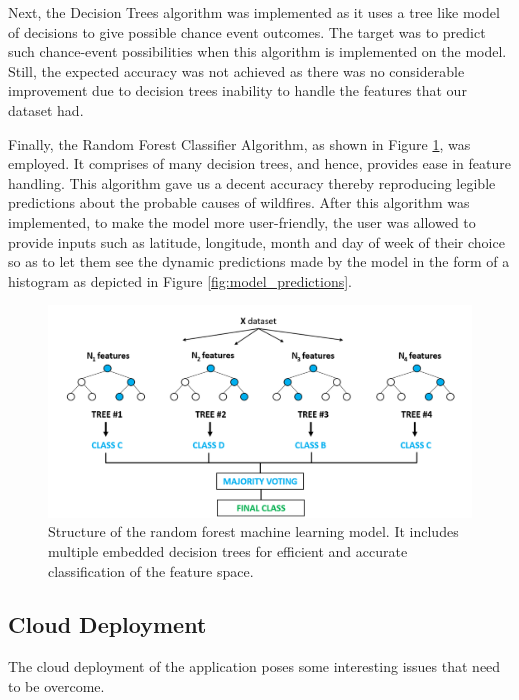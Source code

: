 \documentclass[conference]{IEEEtran}
\begin{document}
Next, the Decision Trees algorithm was implemented as it uses a tree like model of decisions to give possible chance event outcomes. The target was to predict such chance-event possibilities when this algorithm is implemented on the model. Still, the expected accuracy was not achieved as there was no considerable improvement due to decision trees inability to handle the features that our dataset had. \par

Finally, the Random Forest Classifier Algorithm, as shown in Figure \ref{fig:random_forest}, was employed. It comprises of many decision trees, and hence, provides ease in feature handling. This algorithm gave us a decent accuracy thereby reproducing legible predictions about the probable causes of wildfires. After this algorithm was implemented, to make the model more user-friendly, the user was allowed to provide inputs such as latitude, longitude, month and day of week of their choice so as to let them see the dynamic predictions made by the model in the form of a histogram as depicted in Figure \ref{fig:model_predictions}.

\begin{figure}
    \centering
    \includegraphics[scale=0.55]{img/random_forest.PNG}
    \caption{Structure of the random forest machine learning model. It includes multiple embedded decision trees for efficient and accurate classification of the feature space.}
    \label{fig:random_forest}
\end{figure}

\subsection{Cloud Deployment}
The cloud deployment of the application poses some interesting issues that need to be overcome. \par
\end{document}
